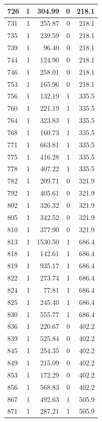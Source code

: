 \documentclass[
  12pt,
]{book}
\begin{document}
\begin{tabular}{l|r|r|r|r}
\hline
726 & 1 & 304.99 & 0 & 218.1\\
\hline
731 & 1 & 255.87 & 0 & 218.1\\
\hline
735 & 1 & 239.59 & 0 & 218.1\\
\hline
739 & 1 & 96.40 & 0 & 218.1\\
\hline
744 & 1 & 124.90 & 0 & 218.1\\
\hline
746 & 1 & 258.01 & 0 & 218.1\\
\hline
753 & 1 & 165.96 & 0 & 218.1\\
\hline
756 & 1 & 132.19 & 1 & 335.5\\
\hline
760 & 1 & 221.19 & 1 & 335.5\\
\hline
764 & 1 & 323.83 & 1 & 335.5\\
\hline
768 & 1 & 160.73 & 1 & 335.5\\
\hline
771 & 1 & 663.81 & 1 & 335.5\\
\hline
775 & 1 & 416.28 & 1 & 335.5\\
\hline
778 & 1 & 407.22 & 1 & 335.5\\
\hline
782 & 1 & 209.71 & 0 & 321.9\\
\hline
792 & 1 & 405.61 & 0 & 321.9\\
\hline
802 & 1 & 326.32 & 0 & 321.9\\
\hline
805 & 1 & 342.52 & 0 & 321.9\\
\hline
810 & 1 & 377.90 & 0 & 321.9\\
\hline
813 & 1 & 1530.50 & 1 & 686.4\\
\hline
818 & 1 & 142.61 & 1 & 686.4\\
\hline
819 & 1 & 935.17 & 1 & 686.4\\
\hline
822 & 1 & 273.74 & 1 & 686.4\\
\hline
824 & 1 & 77.81 & 1 & 686.4\\
\hline
825 & 1 & 245.40 & 1 & 686.4\\
\hline
830 & 1 & 555.77 & 1 & 686.4\\
\hline
836 & 1 & 220.67 & 0 & 402.2\\
\hline
839 & 1 & 525.84 & 0 & 402.2\\
\hline
845 & 1 & 254.35 & 0 & 402.2\\
\hline
849 & 1 & 215.09 & 0 & 402.2\\
\hline
853 & 1 & 172.29 & 0 & 402.2\\
\hline
856 & 1 & 568.83 & 0 & 402.2\\
\hline
867 & 1 & 492.63 & 1 & 505.9\\
\hline
871 & 1 & 287.21 & 1 & 505.9\\

\end{tabular}
\end{document}
